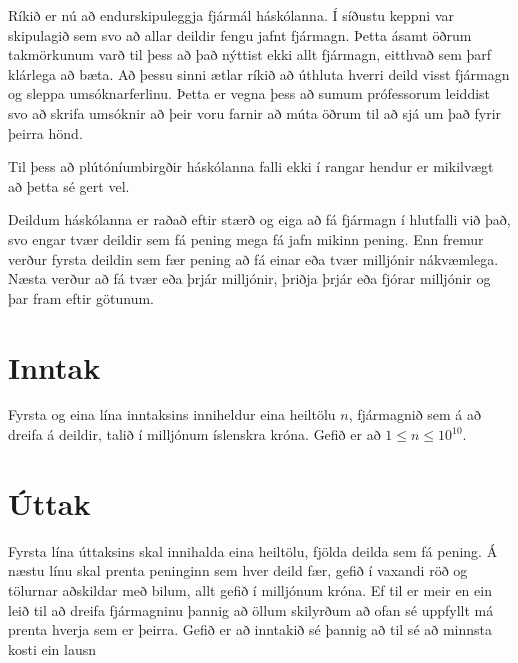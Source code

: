 
Ríkið er nú að endurskipuleggja fjármál háskólanna.
Í síðustu keppni var skipulagið sem svo að allar deildir fengu jafnt fjármagn.
Þetta ásamt öðrum takmörkunum varð til þess að það nýttist ekki allt fjármagn,
eitthvað sem þarf klárlega að bæta.
Að þessu sinni ætlar ríkið að úthluta hverri deild visst fjármagn og sleppa
umsóknarferlinu.
Þetta er vegna þess að sumum prófessorum leiddist svo að skrifa umsóknir að
þeir voru farnir að múta öðrum til að sjá um það fyrir þeirra hönd.

Til þess að plútóníumbirgðir háskólanna falli ekki í rangar hendur er mikilvægt
að þetta sé gert vel.

Deildum háskólanna er raðað eftir stærð og eiga að fá fjármagn í hlutfalli við það,
svo engar tvær deildir sem fá pening mega fá jafn mikinn pening. 
Enn fremur verður fyrsta deildin sem fær pening að fá einar eða tvær milljónir nákvæmlega.
Næsta verður að fá tvær eða þrjár milljónir, þriðja þrjár eða fjórar milljónir
og þar fram eftir götunum.

\section*{Inntak}
Fyrsta og eina lína inntaksins inniheldur eina heiltölu $n$, fjármagnið sem á að dreifa á deildir,
talið í milljónum íslenskra króna. Gefið er að $1 \leq n \leq 10^{10}$.

\section*{Úttak}
Fyrsta lína úttaksins skal innihalda eina heiltölu, fjölda deilda sem fá pening.
Á næstu línu skal prenta peninginn sem hver deild fær, gefið í vaxandi röð og 
tölurnar aðskildar með bilum, allt gefið í milljónum króna.
Ef til er meir en ein leið til að dreifa fjármagninu þannig að öllum skilyrðum að
ofan sé uppfyllt má prenta hverja sem er þeirra.
Gefið er að inntakið sé þannig að til sé að minnsta kosti
ein lausn
